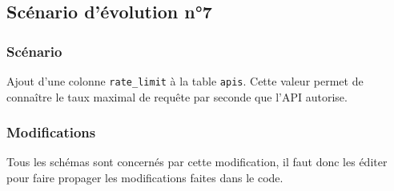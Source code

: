 \subsection{Scénario d'évolution n°7}
\subsubsection{Scénario}
Ajout d'une colonne \texttt{rate_limit} à la table \texttt{apis}. Cette valeur permet de connaître le taux maximal de requête par seconde que l'API autorise.

\subsubsection{Modifications}
Tous les schémas sont concernés par cette modification, il faut donc les éditer pour faire propager les modifications faites dans le code.

